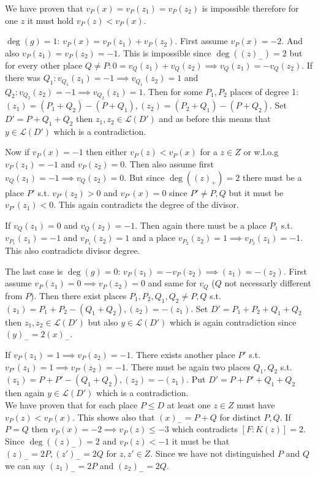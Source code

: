 \documentclass[12pt, a4paper]{article}
\begin{document}
We have proven that $v_P(x)=v_P(z_1)=v_P(z_2)$ is impossible therefore for one $z$ it must hold $v_P(z)<v_P(x)$.

$\deg(g)=1$: $v_P(x)=v_P(z_1)+v_P(z_2)$. First assume $v_P(x)=-2$. And also $v_P(z_1)=v_P(z_2)=-1$. This is impossible since $\deg((z)_{-})=2$ but for every other place $Q \neq P: 0 = v_Q(z_1)+v_Q(z_2) \implies v_Q(z_1)=-v_Q(z_2)$. If there was $Q_1: v_{Q_1}(z_1)=-1 \implies v_{Q_1}(z_2)=1$ and $Q_2: v_{Q_2}(z_2)=-1 \implies v_{Q_2}(z_1)=1$. Then for some $P_1,P_2$ places of degree 1: $(z_1)=(P_1+Q_2)-(P+Q_1), (z_2)=(P_2+Q_1)-(P+Q_2)$. Set $D'=P+Q_1+Q_2$ then $z_1,z_2 \in \mathcal{L}(D')$ and as before this means that $y \in \mathcal{L}(D')$ which is a contradiction.

Now if $v_P(x)=-1$ then either $v_P(z) < v_P(x)$ for a $z \in Z$ or w.l.o.g $v_P(z_1)=-1$ and $v_P(z_2)=0$. Then also assume first $v_Q(z_1)=-1 \implies v_Q(z_2)=0$. But since $\deg((z)_{+})=2$ there must be a place $P'$ s.t. $v_{P'}(z_2)>0$ and $v_{P'}(x)=0$ since $P'\neq P,Q$ but it must be $v_{P'}(z_1) < 0$. This again contradicts the degree of the divisor. 

If $v_Q(z_1)=0$ and $v_Q(z_2)=-1$. Then again there must be a place $P_1$ s.t. $v_{P_1}(z_1)=-1$ and $v_{P_1}(z_2)=1$ and a place $v_{P_2}(z_2)=1 \implies v_{P_2}(z_1)=-1$. This also contradicts divisor degree.

The last case is $\deg(g)=0$: $v_P(z_1)=-v_P(z_2) \implies (z_1) = -(z_2)$. First assume $v_P(z_1)=0 \implies v_P(z_2)=0$ and same for $v_Q$ ($Q$ not necessarly different from $P$). Then there exist places $P_1,P_2,Q_1,Q_2 \neq P,Q$ s.t. $(z_1)=P_1+P_2-(Q_1+Q_2), (z_2)=-(z_1)$. Set $D' = P_1+P_2+Q_1+Q_2$ then $z_1,z_2 \in \mathcal{L}(D')$ but also $y \in \mathcal{L}(D')$ which is again contradiction since $(y)_{-}=2(x)_{-}$.

If $v_P(z_1)=1 \implies v_P(z_2)=-1$. There exists another place $P'$ s.t. $v_{P'}(z_1)=1 \implies v_{P'}(z_2)=-1$. There must be again two places $Q_1,Q_2$ s.t. $(z_1)=P+P'-(Q_1+Q_2), (z_2) = -(z_1)$. Put $D' = P+P'+Q_1+Q_2$ then again $y \in \mathcal{L}(D')$ which is a contradiction.
\\

We have proven that for each place $P \leq D$ at least one $z \in Z$ must have $v_P(z)<v_P(x)$. This shows also that $(x)_{-}=P+Q$ for distinct $P,Q$. If $P=Q$ then $v_P(x)=-2 \implies v_P(z)\leq -3$ which contradicts $[F:K(z)]=2$. Since $\deg((z)_{-})=2$ and $v_P(z) < -1$ it must be that $(z)_{-}=2P, (z')_{-}=2Q$ for $z,z' \in Z$. Since we have not distinguished $P$ and $Q$ we can say $(z_1)_{-}=2P$ and $(z_2)_{-}=2Q$.
\end{document}
